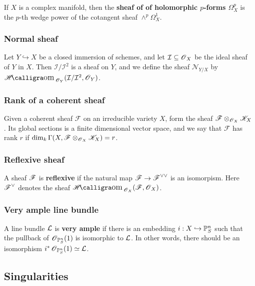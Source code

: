 \documentclass[11pt, english]{article}
\begin{document}
If $X$ is a complex manifold, then the \textbf{sheaf of of holomorphic $p$-forms $\Omega_X^p$} is the $p$-th wedge power of the cotangent sheaf $\wedge^p \Omega_X^1$. 

\subsubsection{Normal sheaf}
\label{normalsheaf}

Let $Y \hookrightarrow X$ be a closed immersion of schemes, and let $\mathcal I \subseteq \operatorname{\mathscr{O}}_X$ be the ideal sheaf of $Y$ in $X$. Then $\mathcal I/\mathcal I^2$ is a sheaf on $Y$, and we define the sheaf $\mathcal N_{Y/X}$ by $\Shom_{\OO_Y}(\mathcal I/\mathcal I^2, \mathcal \OO_Y)$.

\subsubsection{Rank of a coherent sheaf}
\label{ranksheaf}

Given a coherent sheaf $\mathscr F$ on an irreducible variety $X$, form the sheaf ${\mathscr F \otimes_{\operatorname{\mathscr{O}}_X} \mathscr K_X}$. Its global sections is a finite dimensional vector space, and we say that $\mathscr F$ has rank $r$ if $\dim_k \Gamma(X,\mathscr F \otimes_{\operatorname{\mathscr{O}}_X} \mathscr K_X) = r$.

\subsubsection{Reflexive sheaf}
\label{reflexivesheaf}

A sheaf $\operatorname{\mathscr{F}}$ is \textbf{reflexive} if the natural map $\operatorname{\mathscr{F}} \to \operatorname{\mathscr{F}}^{\vee\vee}$ is an isomorpism. Here $\operatorname{\mathscr{F}}^\vee$ denotes the sheaf $\Shom_{\OO_X}(\FF,\OO_X)$.

\subsubsection{Very ample line bundle}
\label{veryample}
A line bundle $\mathcal{L}$ is \textbf{very ample} if there is an embedding $i:X \hookrightarrow \mathbb{P}_S^n$ such that the pullback of $\operatorname{\mathscr{O}}_{\mathbb{P}_S^n}(1)$ is isomorphic to $\mathcal{L}$. In other words, there should be an isomorphism $i^\ast \operatorname{\mathscr{O}}_{\mathbb{P}^n_S}(1) \simeq \mathcal{L}$.

\subsection{Singularities}
\end{document}
